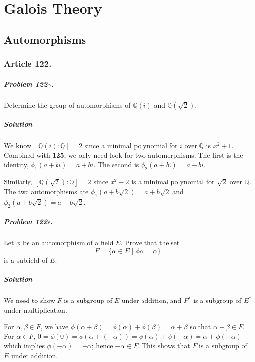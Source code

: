 \chapter{Galois Theory}

\section{Automorphisms}


\subsection{Article 122.}

\paragraph{Problem 122$\gamma$.}
Determine the group of automorphisms of $\mathbb{Q}(i)$ and $\mathbb{Q}(\sqrt{2})$.

\paragraph*{Solution}
We know $[\mathbb{Q}(i) : \mathbb{Q}] = 2$ since a minimal polynomial for $i$ over
$\mathbb{Q}$ is $x^2 + 1$. Combined with \textbf{125}, we only need look for
two automorphisms. The first is the identity, $\phi_1 (a + bi) = a+bi$. The
second is $\phi_2 (a+bi) = a- bi$.

Similarly, $[\mathbb{Q}(\sqrt{2}) : \mathbb{Q}] = 2$ since $x^2 - 2$ is a minimal
polynomial for $\sqrt{2}$ over $\mathbb{Q}$. The two automorphisms are
$\phi_1 (a+b\sqrt{2}) = a + b\sqrt{2}$ and $\phi_2 (a +b\sqrt{2}) = a-b\sqrt{2}$.

\paragraph{Problem 122$\epsilon$.}
Let $\phi$ be an automorphism of a field $E$. Prove that the set
$$ F = \{ \alpha \in E \mid \phi \alpha = \alpha \} $$
is a subfield of $E$.

\paragraph*{Solution}
We need to show $F$ is a subgroup of $E$ under addition, and $F^*$ is a subgroup
of $E^*$ under multiplication.

For $\alpha, \beta \in F$, we have
$\phi (\alpha + \beta) = \phi(\alpha) + \phi(\beta) = \alpha + \beta$ so that
$\alpha + \beta \in F$. For $\alpha \in F$, $0 = \phi(0) = \phi (\alpha + (-\alpha)) =
\phi(\alpha) + \phi(-\alpha) = \alpha + \phi(-\alpha)$ which implies
$\phi(-\alpha) = -\alpha$; hence $-\alpha \in F$. This shows that $F$ is a
subgroup of $E$ under addition.

